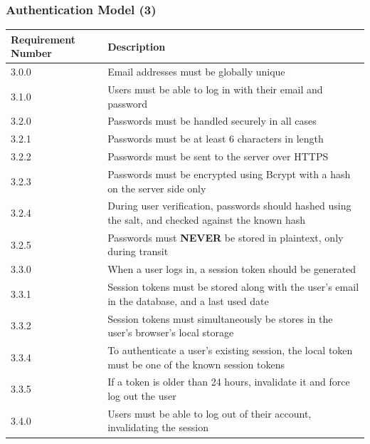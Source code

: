 \documentclass[12pt]{article}
\begin{document}
\subsubsection{Authentication Model (3)}

\setlength{\tabcolsep}{1cm}
\begin{tabular}{|l|p{8cm}|}
    \hline
    Requirement Number & Description                                                                                          \\

    \hline\hline
    3.0.0              & Email addresses must be globally unique                                                              \\

    \hline\hline
    3.1.0              & Users must be able to log in with their email and password                                           \\

    \hline\hline
    3.2.0              & Passwords must be handled securely in all cases                                                      \\
    \hline
    3.2.1              & Passwords must be at least 6 characters in length                                                    \\
    \hline
    3.2.2              & Passwords must be sent to the server over HTTPS                                                      \\
    \hline
    3.2.3              & Passwords must be encrypted using Bcrypt with a hash on the server side only                         \\
    \hline
    3.2.4              & During user verification, passwords should hashed using the salt, and checked against the known hash \\
    \hline
    3.2.5              & Passwords must \textbf{NEVER} be stored in plaintext, only during transit                            \\

    \hline\hline
    3.3.0              & When a user logs in, a session token should be generated                                             \\
    \hline
    3.3.1              & Session tokens must be stored along with the user's email in the database, and a last used date      \\
    \hline
    3.3.2              & Session tokens must simultaneously be stores in the user's browser's local storage                   \\
    \hline
    3.3.4              & To authenticate a user's existing session, the local token must be one of the known session tokens   \\
    \hline
    3.3.5              & If a token is older than 24 hours, invalidate it and force log out the user                          \\

    \hline\hline
    3.4.0              & Users must be able to log out of their account, invalidating the session                             \\
    \hline
\end{tabular}
\end{document}
